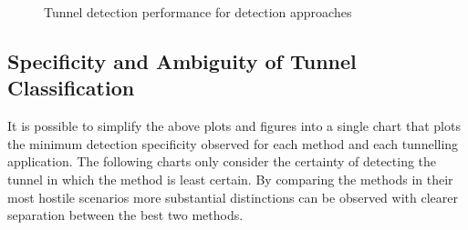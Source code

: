 \documentclass{llncs}
\begin{document}
\begin{figure}[h]
\caption{Tunnel detection performance for detection approaches}
\label{mpv}
\end{figure}


\subsection{Specificity and Ambiguity of Tunnel Classification}
\label{detection-perf-cert}

It is possible to simplify the above plots and figures into a single chart that
plots the minimum detection specificity observed for each method and each
tunnelling application. The following charts only consider the certainty of
detecting the tunnel in which the method is least certain. By comparing the
methods in their most hostile scenarios more substantial distinctions can be
observed with clearer separation between the best two methods.
\end{document}
